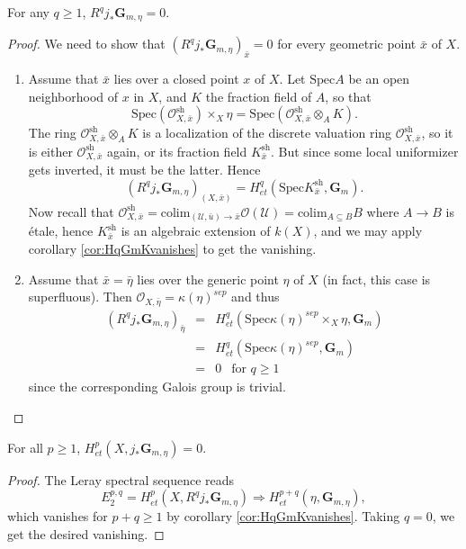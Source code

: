 \begin{lemma}
For any $q \geq 1$, $R^q j_*\mathbf{G}_{m,\eta} = 0$.
\end{lemma}

\begin{proof}
We need to show that $(R^q j_*\mathbf{G}_{m,\eta})_{\bar x} = 0$ for every geometric point $\bar x$ of $X$. 
\begin{enumerate}
\item
Assume that $\bar x$ lies over a closed point $x$ of $X$. Let $\text{Spec} A$ be an open neighborhood of $x$ in $X$, and $K$ the fraction field of $A$, so that
$$
\text{Spec}(\mathcal{O}^\text{sh}_{X,\bar x}) \times_X \eta = \text{Spec}(\mathcal{O}^\text{sh}_{X,\bar x} \otimes_A K).
$$
The ring $\mathcal{O}^\text{sh}_{X,\bar x} \otimes_A K$ is a localization of the discrete valuation ring $\mathcal{O}^\text{sh}_{X,\bar x}$, so it is either $\mathcal{O}^\text{sh}_{X,\bar x}$ again, or its fraction field $K^\text{sh}_{\bar x}$. But since some local uniformizer gets inverted, it must be the latter. Hence
$$
(R^q j_*\mathbf{G}_{m,\eta})_{(X, \bar x)} = H_{et}^q(\text{Spec} K^\text{sh}_{\bar x}, \mathbf{G}_m).
$$
Now recall that $\mathcal{O}^\text{sh}_{X, \bar x} = \text{colim}_{(\mathcal{U},\bar u) \to \bar x} \mathcal{O} (\mathcal{U}) = \text{colim}_{A \subseteq B} B$ where $A \to B$ is \'etale, hence $K^\text{sh}_{\bar x}$ is an algebraic extension of $k(X)$, and we may apply corollary \ref{cor:HqGmKvanishes} to get the vanishing.
\item
Assume that $\bar x = \bar \eta$ lies over the generic point $\eta$ of $X$ (in fact, this case is superfluous). Then $\mathcal{O}_{X,\bar \eta} = \kappa(\eta)^{sep}$ and thus
\begin{eqnarray*}
(R^q j_*\mathbf{G}_{m,\eta})_{\bar \eta}
& = &
H_{et}^q(\text{Spec} \kappa(\eta)^{sep} \times_X \eta, \mathbf{G}_m) \\
& = & H_{et}^q (\text{Spec} \kappa(\eta)^{sep}, \mathbf{G}_m)  \\
& = & 0 \ \ \text{ for } q \geq 1
\end{eqnarray*}
since the corresponding Galois group is trivial.
\end{enumerate}
\end{proof}

\begin{lemma}
For all $p \geq 1$, $H_{et}^p(X, j_*\mathbf{G}_{m,\eta}) = 0$.
\end{lemma}

\begin{proof}
The Leray spectral sequence reads
$$
E_2^{p,q} = H_{et}^p(X, R^qj_*\mathbf{G}_{m,\eta}) \Rightarrow H_{et}^{p+q}(\eta, \mathbf{G}_{m,\eta}),
$$
which vanishes for $p+q \geq 1$ by corollary \ref{cor:HqGmKvanishes}. Taking $q = 0$, we get the desired vanishing.
\end{proof}


